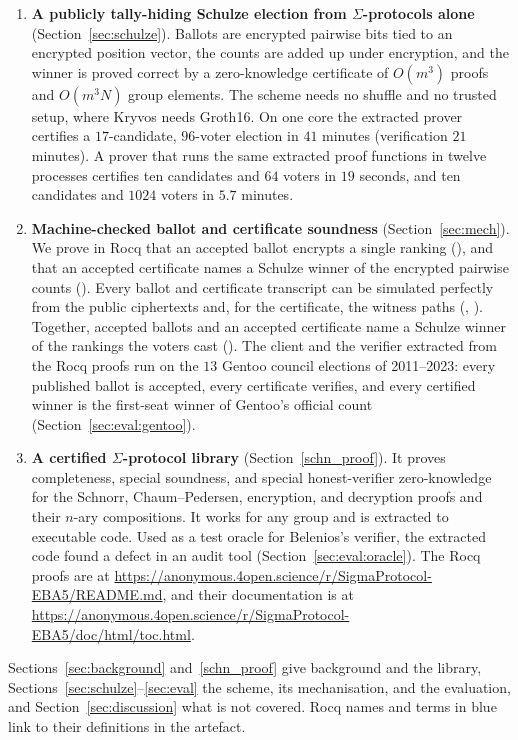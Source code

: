 \begin{enumerate}
  \item \textbf{A publicly tally-hiding Schulze election from
  $\Sigma$-protocols alone} (Section~\ref{sec:schulze}). Ballots are
  encrypted pairwise bits tied to an encrypted position vector, the
  counts are added up under encryption, and the winner is proved correct
  by a zero-knowledge certificate of $O(m^3)$ proofs and $O(m^3 N)$
  group elements. The scheme needs no shuffle and no
  trusted setup, where Kryvos needs Groth16. On one core the extracted
  prover certifies a $17$-candidate, $96$-voter election in $41$ minutes
  (verification $21$ minutes). A prover that runs the same
  extracted proof functions in twelve processes certifies ten candidates
  and $64$ voters in $19$ seconds, and ten candidates and $1024$ voters
  in $5.7$ minutes.
  \item \textbf{Machine-checked ballot and certificate soundness}
  (Section~\ref{sec:mech}). We prove in Rocq that an accepted ballot
  encrypts a single ranking (), and that an accepted
  certificate names a Schulze winner of the encrypted pairwise counts
  (). Every ballot and certificate transcript
  can be simulated perfectly from the public ciphertexts and, for the
  certificate, the witness paths (, ).
  Together, accepted ballots and an accepted certificate name a Schulze
  winner of the rankings the voters cast ().
  The client and the verifier extracted from the Rocq proofs run on the
  $13$ Gentoo council elections of 2011--2023: every published ballot is
  accepted, every certificate verifies, and every certified winner is the
  first-seat winner of Gentoo's official count
  (Section~\ref{sec:eval:gentoo}).
  \item \textbf{A certified $\Sigma$-protocol library}
  (Section~\ref{schn_proof}). It proves completeness, special soundness,
  and special honest-verifier zero-knowledge for the Schnorr,
  Chaum--Pedersen, encryption, and decryption proofs and their $n$-ary
  compositions. It works for any group and is extracted to executable
  code. Used as a test oracle for Belenios's verifier, the extracted code
  found a defect in an audit tool (Section~\ref{sec:eval:oracle}). The
  Rocq proofs are at
  \textcolor{rocqlink}{\url{https://anonymous.4open.science/r/SigmaProtocol-EBA5/README.md}},
  and their documentation is at
  \textcolor{rocqlink}{\url{https://anonymous.4open.science/r/SigmaProtocol-EBA5/doc/html/toc.html}}.
\end{enumerate}

Sections~\ref{sec:background} and~\ref{schn_proof} give background and
the library, Sections~\ref{sec:schulze}--\ref{sec:eval} the scheme, its
mechanisation, and the evaluation, and Section~\ref{sec:discussion} what
is not covered. Rocq names and terms
in \textcolor{rocqlink}{blue} link to their definitions in the artefact.
